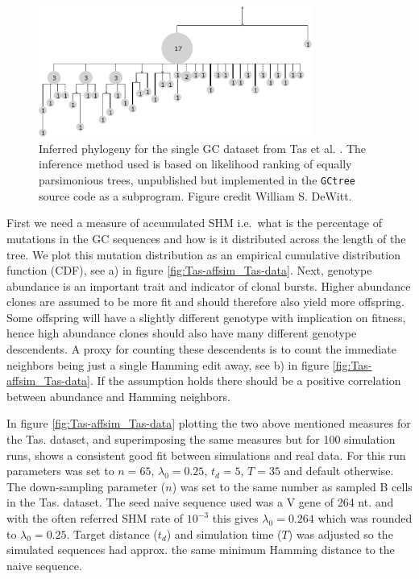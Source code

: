 \begin{figure}[!ht]
    \centering
    \includegraphics[width=0.8\textwidth]{figures/Tas_tree.pdf}
    \caption{
        \label{fig:Tas_tree}
        Inferred phylogeny for the single GC dataset from Tas et al. \cite{tas2016visualizing}.
        The inference method used is based on likelihood ranking of equally parsimonious trees, unpublished but implemented in the \texttt{GCtree} source code as a subprogram.
        Figure credit William S. DeWitt.
    }
\end{figure}


First we need a measure of accumulated SHM i.e.\ what is the percentage of mutations in the GC sequences and how is it distributed across the length of the tree.
We plot this mutation distribution as an empirical cumulative distribution function (CDF), see a) in figure \ref{fig:Tas-affsim_Tas-data}.
Next, genotype abundance is an important trait and indicator of clonal bursts.
Higher abundance clones are assumed to be more fit and should therefore also yield more offspring.
Some offspring will have a slightly different genotype with implication on fitness, hence high abundance clones should also have many different genotype descendents.
A proxy for counting these descendents is to count the immediate neighbors being just a single Hamming edit away, see b) in figure \ref{fig:Tas-affsim_Tas-data}.
If the assumption holds there should be a positive correlation between abundance and Hamming neighbors.

In figure \ref{fig:Tas-affsim_Tas-data} plotting the two above mentioned measures for the Tas. dataset, and superimposing the same measures but for 100 simulation runs, shows a consistent good fit between simulations and real data.
For this run parameters was set to $n=65$, $\lambda_0=0.25$, $t_d=5$, $T=35$ and default otherwise.
The down-sampling parameter ($n$) was set to the same number as sampled B cells in the Tas. dataset.
The seed naive sequence used was a V gene of 264 nt. and with the often referred SHM rate of $10^{-3}$ \cite{victora2012germinal} this gives $\lambda_0=0.264$ which was rounded to $\lambda_0=0.25$.
Target distance ($t_d$) and simulation time ($T$) was adjusted so the simulated sequences had approx. the same minimum Hamming distance to the naive sequence.

